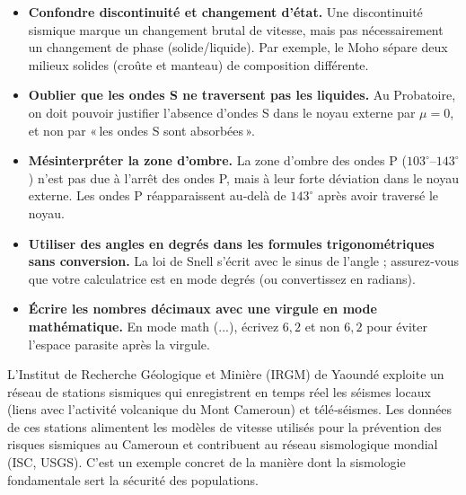 \documentclass[11pt]{article}
\begin{document}
\begin{attention}
\begin{itemize}
  \item \textbf{Confondre discontinuité et changement d'état.} Une discontinuité sismique marque un changement brutal de vitesse, mais pas nécessairement un changement de phase (solide/liquide). Par exemple, le Moho sépare deux milieux solides (croûte et manteau) de composition différente.
  \item \textbf{Oublier que les ondes S ne traversent pas les liquides.} Au Probatoire, on doit pouvoir justifier l'absence d'ondes S dans le noyau externe par $\mu = 0$, et non par « les ondes S sont absorbées ».
  \item \textbf{Mésinterpréter la zone d'ombre.} La zone d'ombre des ondes P ($103^\circ$–$143^\circ$) n'est pas due à l'arrêt des ondes P, mais à leur forte déviation dans le noyau externe. Les ondes P réapparaissent au‑delà de $143^\circ$ après avoir traversé le noyau.
  \item \textbf{Utiliser des angles en degrés dans les formules trigonométriques sans conversion.} La loi de Snell s'écrit avec le sinus de l'angle ; assurez‑vous que votre calculatrice est en mode degrés (ou convertissez en radians).
  \item \textbf{Écrire les nombres décimaux avec une virgule en mode mathématique.} En mode math ($...$), écrivez $6{,}2$ et non $6,2$ pour éviter l'espace parasite après la virgule.
\end{itemize}
\end{attention}

\begin{savaistu}
L'Institut de Recherche Géologique et Minière (IRGM) de Yaoundé exploite un réseau de stations sismiques qui enregistrent en temps réel les séismes locaux (liens avec l'activité volcanique du Mont Cameroun) et télé‑séismes. Les données de ces stations alimentent les modèles de vitesse utilisés pour la prévention des risques sismiques au Cameroun et contribuent au réseau sismologique mondial (ISC, USGS). C'est un exemple concret de la manière dont la sismologie fondamentale sert la sécurité des populations.
\end{savaistu}
\end{document}
